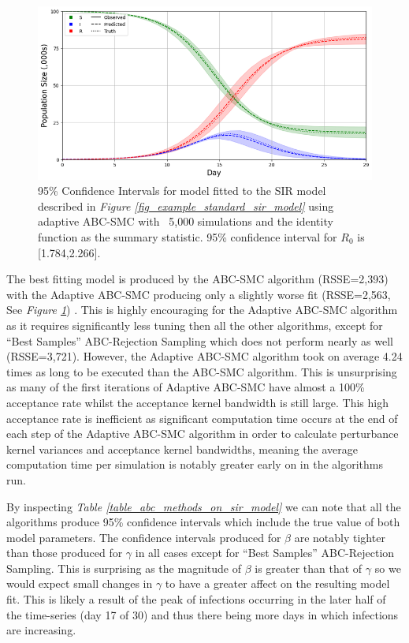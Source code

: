\documentclass[11pt,a4paper]{article}
\theoremstyle{break}
\begin{document}
  \begin{figure}[H]
    \centering\includegraphics[width=.7\textwidth]{Semi_Auto_ABC_SMC_full_data_CI.png}
    \caption{95\% Confidence Intervals for model fitted to the SIR model described in \textit{Figure \ref{fig_example_standard_sir_model}} using adaptive ABC-SMC with ~5,000 simulations and the identity function as the summary statistic. 95\% confidence interval for $R_0$ is [1.784,2.266].}
    \label{fig_abc_smc_sir_identity_95_ci}
  \end{figure}

  \par The best fitting model is produced by the ABC-SMC algorithm (RSSE=2,393) with the Adaptive ABC-SMC producing only a slightly worse fit (RSSE=2,563, See \textit{Figure \ref{fig_abc_smc_sir_identity_95_ci}}) . This is highly encouraging for the Adaptive ABC-SMC algorithm as it requires significantly less tuning then all the other algorithms, except for ``Best Samples'' ABC-Rejection Sampling which does not perform nearly as well (RSSE=3,721). However, the Adaptive ABC-SMC algorithm took on average 4.24 times as long to be executed than the ABC-SMC algorithm. This is unsurprising as many of the first iterations of Adaptive ABC-SMC have almost a 100\% acceptance rate whilst the acceptance kernel bandwidth is still large. This high acceptance rate is inefficient as significant computation time occurs at the end of each step of the Adaptive ABC-SMC algorithm in order to calculate perturbance kernel variances and acceptance kernel bandwidths, meaning the average computation time per simulation is notably greater early on in the algorithms run.

  \par By inspecting \textit{Table \ref{table_abc_methods_on_sir_model}} we can note that all the algorithms produce 95\% confidence intervals which include the true value of both model parameters. The confidence intervals produced for $\beta$ are notably tighter than those produced for $\gamma$ in all cases except for ``Best Samples'' ABC-Rejection Sampling. This is surprising as the magnitude of $\beta$ is greater than that of $\gamma$ so we would expect small changes in $\gamma$ to have a greater affect on the resulting model fit. This is likely a result of the peak of infections occurring in the later half of the time-series (day 17 of 30) and thus there being more days in which infections are increasing.
\end{document}
